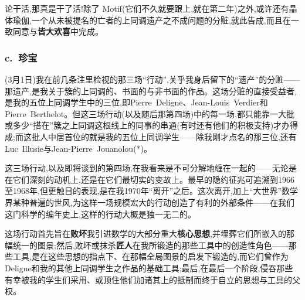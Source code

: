 论干活,那真是干了活!除了 Motif(它们不久就要跟上,就在第二年)之外,或许还有晶体瑜伽,一个从未被提名的亡者的上同调遗产之不成问题的分赃,就此告成,而且在一致同意与\textbf{皆大欢喜}中完成。



\subsubsection*{c.~珍宝}



\dmark{}(3月1日)我在前几条注里检视的那三场“行动”,关乎我身后留下的“遗产”的分赃——那遗产,是我关于簇的上同调的、书面的与非书面的作品。这场分赃的直接受益者,是我的五位上同调学生中的三位,即Pierre~Deligne、Jean-Louis~Verdier和Pierre~Berthelot。但这三场行动(以及随后那第四场)中的每一场,都只能靠一大批或多少“搭在”簇之上同调这根线上的同事的串通(有时还有他们的积极支持)才办得成;而这批人中居首位的就是我的五位上同调学生——除我刚才点名的那三位,还有Luc~Illusie与Jean-Pierre~Jouanolou(*)。

这三场行动,以及即将谈到的第四场,在我看来是不可分解地缠在一起的——无论是在它们深刻的动机上,还是在它们最切实的变故上。最早的隐约征兆可追溯到1966至1968年,但更触目的表现,是在我1970年“离开”之后。这次离开,加上“大世界”数学界某种普遍的世风,为这样一场规模宏大的行动创造了有利的外部条件——在我们这门科学的编年史上,这样的行动大概是独一无二的。

这场行动首先旨在\textbf{败坏}我引进数学的大部分重大\textbf{核心思想},并埋葬它们所嵌入的那幅统一的图景;然后,败坏或抹杀\textbf{匠人}在我所锻造的那些工具中的创造性角色——那些工具,是在这些思想的指点下、在那幅全局图景的启发下锻造的,而它们曾作为Deligne和我的其他上同调学生之作品的基础工具;最后,在最后一个阶段,侵吞那些有幸被我的学生们采用、或顶住他们加诸其上的\dmark{}抵制而终于自立的思想与工具的父权。


